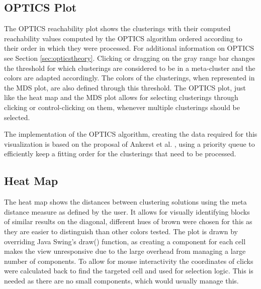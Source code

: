 \documentclass[
	a4paper,
	english,
	twoside,
	openright,               
	11pt                            
	]{report}
\begin{document}
\subsection{OPTICS Plot}
The OPTICS reachability plot shows the clusterings with their computed reachability values computed by the OPTICS algorithm ordered according to their order in which they were processed. For additional information on OPTICS see Section \ref{sec:opticstheory}. Clicking or dragging on the gray range bar changes the threshold for which clusterings are considered to be in a meta-cluster and the colors are adapted accordingly. The colors of the clusterings, when represented in the MDS plot, are also defined through this threshold. The OPTICS plot, just like the heat map and the MDS plot allows for selecting clusterings through clicking or control-clicking on them, whenever multiple clusterings should be selected.

The implementation of the OPTICS algorithm, creating the data required for this visualization is based on the proposal of Ankerst et al. \cite{10.1145/304181.304187}, using a priority queue to efficiently keep a fitting order for the clusterings that need to be processed.

\subsection{Heat Map}
The heat map shows the distances between clustering solutions using the meta distance measure as defined by the user. It allows for visually identifying blocks of similar results on the diagonal, different hues of brown were chosen for this as they are easier to distinguish than other colors tested. The plot is drawn by overriding Java Swing's \cite{javaswing} draw() function, as creating a component for each cell makes the view unresponsive due to the large overhead from managing a large number of components. To allow for mouse interactivity the coordinates of clicks were calculated back to find the targeted cell and used for selection logic. This is needed as there are no small components, which would usually manage this.
\end{document}
